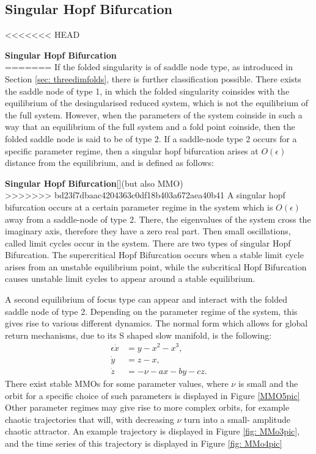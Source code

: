 \begin{theorem}
\subsection{Singular Hopf Bifurcation}

<<<<<<< HEAD
\begin{definition}{\textbf{Singular Hopf Bifurcation} \citealp{strogatz2007nonlinear}}\\
=======
If the folded singularity is of saddle node type, as introduced in Section \ref{sec: threedimfolds}, there is further classification possible.
There exists the saddle node of type 1, in which the folded singularity coinsides with the equilibrium of the desingularised reduced system, which is not the equilibrium of the full system. However, when the parameters of the system coinside in such a way that an equilibrium of the full system and a fold point coinside, then the folded saddle node is said to be of type 2. 
If a saddle-node type 2 occurs for a specific parameter regime, then a singular hopf bifurcation arises at $O(\epsilon)$ distance from the equilibrium, and is defined as follows:
\begin{definition}{\textbf{Singular Hopf Bifurcation}}[\citealp{strogatz2007nonlinear}](but also MMO) \\
>>>>>>> bd23f7dbaac4204363c0df18b403a672aea40b41
A singular hopf bifurcation occurs at a certain parameter regime in the system which is $O(\epsilon)$ away from a saddle-node of type 2. There, the eigenvalues of the system cross the imaginary axis, therefore they have a zero real part. Then small oscillations, called limit cycles occur in the system. There are two types of singular Hopf Bifurcation.
The supercritical Hopf Bifurcation occurs when a stable limit cycle arises from an unstable equilibrium point, while the subcritical Hopf Bifurcation causes unstable limit cycles to appear around a stable equilibrium.
\end{definition}

A second equilibrium of focus type can appear and interact with the folded saddle node of type 2.
Depending on the parameter regime of the system, this gives rise to various different dynamics.
The normal form which allows for global return mechanisms, due to its S shaped slow manifold, is the following:
\begin{align*}
\epsilon \dot{x} &= y - x^2 - x^3, \\
\dot{y} &= z - x, \\
\dot{z} &= -\nu -ax -by -cz.
\end{align*}
There exist stable MMOs for some parameter values, where $\nu$ is small and the orbit for a specific choice of such parameters is displayed in Figure \ref{MMO5pic}
Other parameter regimes may give rise to more complex orbits, for example chaotic trajectories that will, with decreasing $\nu$ turn into a small- amplitude chaotic attractor. An example trajectory is displayed in Figure \ref{fig: MMo3pic}, and the time series of this trajectory is displayed in Figure \ref{fig: MMo4pic} 


\end{definition}
\end{theorem}
